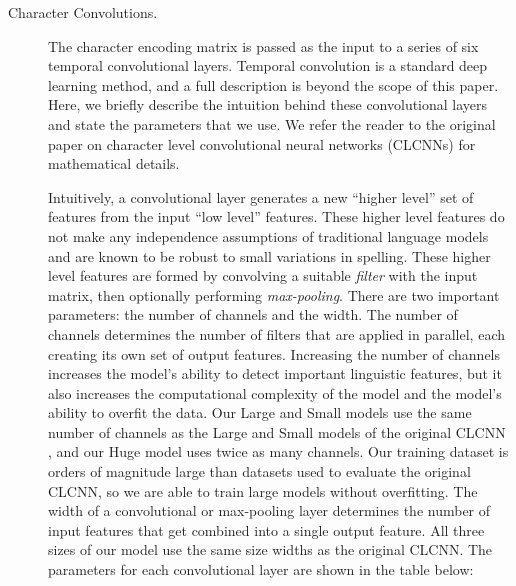 \documentclass[sigconf,anonymous,review,10pt]{acmart}
\newcommand{\defn}[1]{\textit{#1}}
\begin{document}
\begin{description}

\item[Character Convolutions.]
    The character encoding matrix is passed as the input to a series of six temporal convolutional layers.
    Temporal convolution is a standard deep learning method,
    and a full description is beyond the scope of this paper.
    Here, we briefly describe the intuition behind these convolutional layers and state the parameters that we use.
    We refer the reader to %
    the original paper on character level convolutional neural networks (CLCNNs) \citep{zhang2015character} for mathematical details.

    Intuitively, a convolutional layer generates a new ``higher level'' set of features from the input ``low level'' features.
    These higher level features do not make any independence assumptions of traditional language models and are known to be robust to small variations in spelling.
    These higher level features are formed by convolving a suitable \defn{filter} with the input matrix, 
    then optionally performing \defn{max-pooling}.
    There are two important parameters: the number of channels and the width.
    The number of channels determines the number of filters that are applied in parallel,
    each creating its own set of output features.
    Increasing the number of channels increases the model's ability to detect important linguistic features,
    but it also increases the computational complexity of the model and the model's ability to overfit the data.
    Our Large and Small models use the same number of channels as the Large and Small models of the original CLCNN \citep{zhang2015character},
    and our Huge model uses twice as many channels.
    Our training dataset is orders of magnitude large than datasets used to evaluate the original CLCNN,
    so we are able to train large models without overfitting.
    The width of a convolutional or max-pooling layer determines the number of input features that get combined into a single output feature.
    All three sizes of our model use the same size widths as the original CLCNN.
    The parameters for each convolutional layer are shown in the table below:


\end{description}
\end{document}
